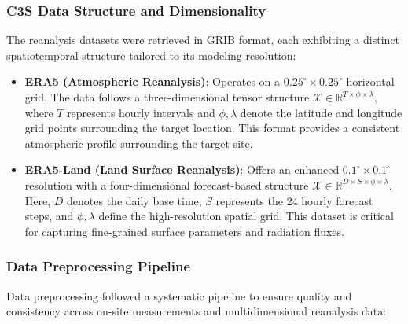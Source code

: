\documentclass[conference]{IEEEtran}
\begin{document}
\subsubsection{\textbf{C3S Data Structure and Dimensionality}}
The reanalysis datasets were retrieved in GRIB format, each exhibiting a distinct spatiotemporal structure tailored to its modeling resolution:

\begin{itemize}
	\item \textbf{ERA5 (Atmospheric Reanalysis)}: Operates on a $0.25^\circ \times 0.25^\circ$ horizontal grid. The data follows a three-dimensional tensor structure $\mathcal{X} \in \mathbb{R}^{T \times \phi \times \lambda}$, where $T$ represents hourly intervals and $\phi, \lambda$ denote the latitude and longitude grid points surrounding the target location. This format provides a consistent atmospheric profile surrounding the target site.
	\item \textbf{ERA5-Land (Land Surface Reanalysis)}: Offers an enhanced $0.1^\circ \times 0.1^\circ$ resolution with a four-dimensional forecast-based structure $\mathcal{X} \in \mathbb{R}^{D \times S \times \phi \times \lambda}$. Here, $D$ denotes the daily base time, $S$ represents the 24 hourly forecast steps, and $\phi, \lambda$ define the high-resolution spatial grid. This dataset is critical for capturing fine-grained surface parameters and radiation fluxes.
\end{itemize}

\subsubsection{\textbf{Data Preprocessing Pipeline}}
Data preprocessing followed a systematic pipeline to ensure quality and consistency across on-site measurements and multidimensional reanalysis data:
\end{document}
